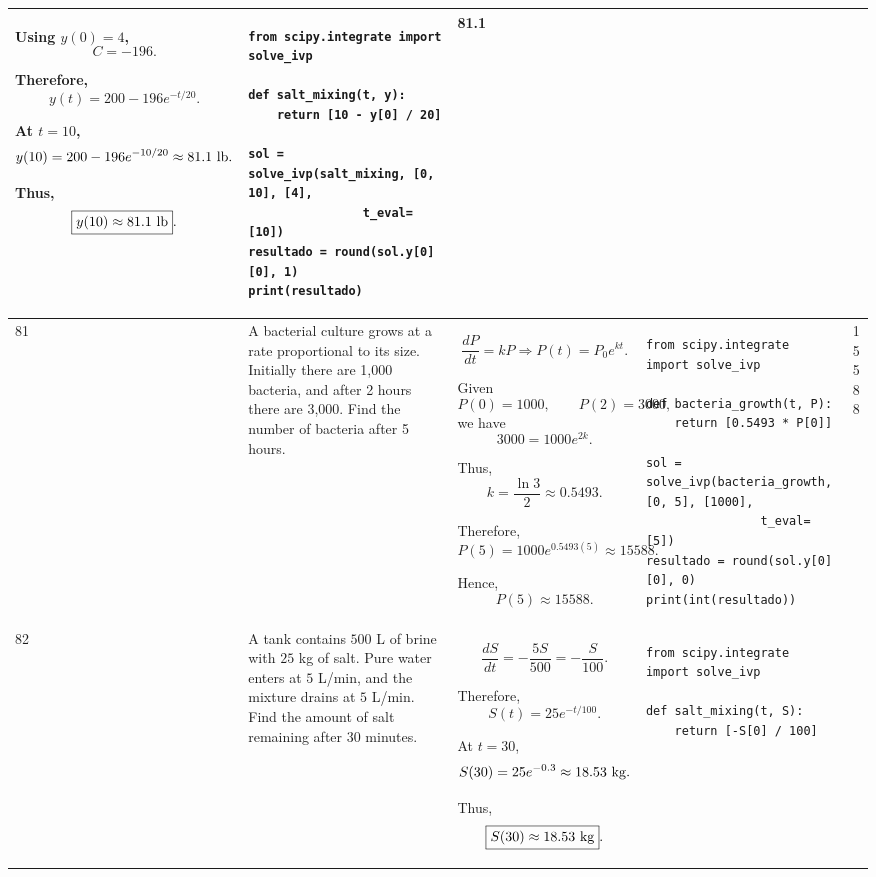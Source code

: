 \documentclass[a4paper,12pt]{article}
\begin{document}
\begin{longtable}{|p{0.3cm}|p{}|p{10cm}|p{}|p{1.5cm}|}
Using $y(0)=4$,
\[
C=-196.
\]

Therefore,
\[
y(t)=200-196e^{-t/20}.
\]

At $t=10$,
\[
y(10)=200-196e^{-10/20}
\approx81.1\ {\rm lb}.
\]

Thus,
\[
\boxed{y(10)\approx81.1\ {\rm lb}}.
\]
&
\begin{verbatim}
from scipy.integrate import solve_ivp

def salt_mixing(t, y):
    return [10 - y[0] / 20]

sol = solve_ivp(salt_mixing, [0, 10], [4],
                t_eval=[10])
resultado = round(sol.y[0][0], 1)
print(resultado)
\end{verbatim}
&
81.1 \\
\hline

81 &
A bacterial culture grows at a rate proportional to its size. Initially there are 1,000 bacteria, and after 2 hours there are 3,000. Find the number of bacteria after 5 hours. &
\[
\frac{dP}{dt}=kP
\Rightarrow
P(t)=P_0e^{kt}.
\]

Given
\[
P(0)=1000,\qquad P(2)=3000,
\]
we have
\[
3000=1000e^{2k}.
\]

Thus,
\[
k=\frac{\ln3}{2}\approx0.5493.
\]

Therefore,
\[
P(5)=1000e^{0.5493(5)}
\approx15588.
\]

Hence,
\[
\boxed{P(5)\approx15588}.
\]
&
\begin{verbatim}
from scipy.integrate import solve_ivp

def bacteria_growth(t, P):
    return [0.5493 * P[0]]

sol = solve_ivp(bacteria_growth, [0, 5], [1000],
                t_eval=[5])
resultado = round(sol.y[0][0], 0)
print(int(resultado))
\end{verbatim}
&
15588 \\
\hline

82 &
A tank contains $500$ L of brine with $25$ kg of salt. Pure water enters at $5$ L/min, and the mixture drains at $5$ L/min. Find the amount of salt remaining after 30 minutes. &
\[
\frac{dS}{dt}
=-\frac{5S}{500}
=-\frac{S}{100}.
\]

Therefore,
\[
S(t)=25e^{-t/100}.
\]

At $t=30$,
\[
S(30)=25e^{-0.3}
\approx18.53\ {\rm kg}.
\]

Thus,
\[
\boxed{S(30)\approx18.53\ {\rm kg}}.
\]
&
\begin{verbatim}
from scipy.integrate import solve_ivp

def salt_mixing(t, S):
    return [-S[0] / 100]


\end{verbatim}
\end{longtable}
\end{document}
